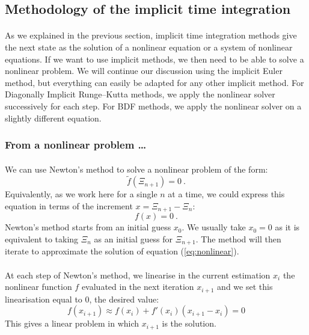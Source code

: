    \subsection{Methodology of the implicit time integration}

      \paragraph{}
      As we explained in the previous section, implicit time integration methods give the next state as the solution of a nonlinear equation or a system of nonlinear equations.
      If we want to use implicit methods, we then need to be able to solve a nonlinear problem.
      We will continue our discussion using the implicit Euler method, but everything can easily be adapted for any other implicit method.
      For Diagonally Implicit Runge--Kutta methods, we apply the nonlinear solver successively for each step.
      For BDF methods, we apply the nonlinear solver on a slightly different equation.


      \subsubsection{From a nonlinear problem \dots}

      	\paragraph{}
      	We can use Newton's method to solve a nonlinear problem of the form:
      	\begin{equation}
      		\tilde{f}\left(\Xi_{n+1}\right) = 0 \ .
      	\end{equation}
        Equivalently, as we work here for a single $n$ at a time, we could express this equation in terms of the increment $x = \Xi_{n+1} - \Xi_n$:
        \begin{equation}\label{eq:nonlinear}
      		f\left(x\right) = 0 \ .
      	\end{equation}
        Newton's method starts from an initial guess $x_0$.
        We usually take $x_0 = 0$ as it is equivalent to taking $\Xi_n$ as an initial guess for $\Xi_{n+1}$.
        The method will then iterate to approximate the solution of equation (\ref{eq:nonlinear}).

        \paragraph{}
        At each step of Newton's method, we linearise  in the current estimation $x_i$ the nonlinear function $f$ evaluated  in the next iteration $x_{i+1}$ and we set this linearisation equal to 0, the desired value:
        \begin{equation}\label{eq:nonlinear_linearised}
          f\left(x_{i+1}\right) \approx f\left(x_i\right) + f'\left(x_i\right) \left( x_{i+1} - x_i \right) = 0
        \end{equation}
        This gives a linear problem in which $x_{i+1}$ is the solution.


